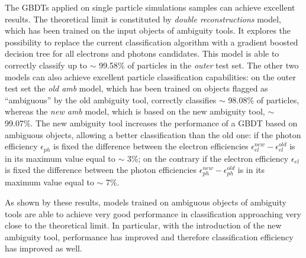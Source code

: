 \documentclass[a4paper, oneside, 11pt, openright]{book}
\begin{document}
		The GBDTs applied on single particle simulations samples can achieve excellent results. The theoretical limit is constituted by \textit{double reconstructions} model, which has been trained on the input objects of ambiguity tools. It explores the possibility to replace the current classification algorithm with a gradient boosted decision tree for all electrons and photons candidates. This model is able to correctly classify up to $\sim$ 99.58\% of particles in the \textit{outer} test set. The other two models can also achieve excellent particle classification capabilities: on the outer test set the \textit{old amb} model, which has been trained on objects flagged as “ambiguous” by the old ambiguity tool, correctly classifies $\sim$ 98.08\% of particles, whereas the \textit{new amb} model,  which is based on the new ambiguity tool, $\sim$ 99.07\%. The new ambiguity tool  increases the performance of a GBDT based on ambiguous objects, allowing a better classification than the old one: if the photon efficiency $\epsilon_{ph}$ is fixed the difference between the electron efficiencies $\epsilon_{el}^{new} - \epsilon_{el}^{old}$ is in its maximum value equal to $\sim$ 3\%; on the contrary if the electron efficiency $\epsilon_{el}$ is fixed the difference between the photon efficiencies $\epsilon_{ph}^{new} - \epsilon_{ph}^{old}$ is in its maximum value equal to $\sim$ 7\%.
		
		As shown by these results, models trained on ambiguous objects of ambiguity tools are able to achieve very good performance in classification approaching very close to the theoretical limit. In particular, with the introduction of the new ambiguity tool, performance has improved and therefore classification efficiency has improved as well.
	
	\appendix
\end{document}
